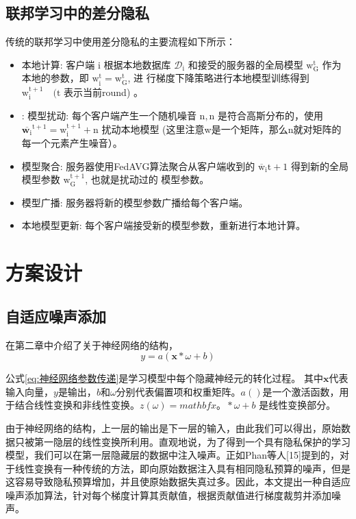 \subsection{联邦学习中的差分隐私}
传统的联邦学习中使用差分隐私的主要流程如下所示：
\begin{itemize}
\item 本地计算:
客户端 $\mathrm{i}$ 根据本地数据库 $\mathcal{D}_{\mathrm{i}}$ 和接受的服务器的全局模型 $\mathrm{w}_{\mathrm{G}}^{\mathrm{t}}$ 作为本地的参数，即 $\mathrm{w}_{\mathrm{i}}^{\mathrm{t}}=\mathrm{w}_{\mathrm{G}}^{\mathrm{t}}$, 进 行梯度下降策略进行本地模型训练得到 $\mathrm{w}_{\mathrm{i}}^{\mathrm{t}+1} \quad(\mathrm{t}$ 表示当前round) 。

\item: 模型扰动:
每个客户端产生一个随机噪音 $\mathrm{n}, \mathrm{n}$ 是符合高斯分布的，使用 $\overline{\mathbf{w}_{\mathrm{i}}}^{\mathrm{t}+1}=\mathrm{w}_{\mathrm{i}}^{\mathrm{t}+1}+\mathrm{n}$ 扰动本地模型 (这里注意w是一个矩阵，那么n就对矩阵的每一个元素产生噪音）。

\item 模型聚合:
服务器使用FedAVG算法聚合从客户端收到的 $\overline{\mathrm{w}}_{\mathrm{i}} \mathrm{t}+1$ 得到新的全局模型参数 $\mathrm{w}_{\mathrm{G}}^{\mathrm{t}+1}$, 也就是扰动过的 模型参数。

\item 模型广播:
服务器将新的模型参数广播给每个客户端。

\item 本地模型更新:
每个客户端接受新的模型参数，重新进行本地计算。
\end{itemize}

\section{方案设计}
\subsection{自适应噪声添加}
在第二章中介绍了关于神经网络的结构，
\begin{equation}\label{eq:神经网络参数传递}
y=a(\mathbf{x} * \omega+b)
\end{equation}

公式\ref{eq:神经网络参数传递}是学习模型中每个隐藏神经元的转化过程。
其中$\mathbf{x}$代表输入向量，$y$是输出，$b$和$\omega$分别代表偏置项和权重矩阵。$a()$是一个激活函数，用于结合线性变换和非线性变换。$z(\omega)=mathbf{x}。* \omega+b$ 是线性变换部分。

由于神经网络的结构，上一层的输出是下一层的输入，由此我们可以得出，原始数据只被第一隐层的线性变换所利用。直观地说，为了得到一个具有隐私保护的学习模型，我们可以在第一层隐藏层的数据中注入噪声。正如Phan等人[15]提到的，对于线性变换有一种传统的方法，即向原始数据注入具有相同隐私预算的噪声，但是这容易导致隐私预算增加，并且使原始数据失真过多。因此，本文提出一种自适应噪声添加算法，针对每个梯度计算其贡献值，根据贡献值进行梯度裁剪并添加噪声。

